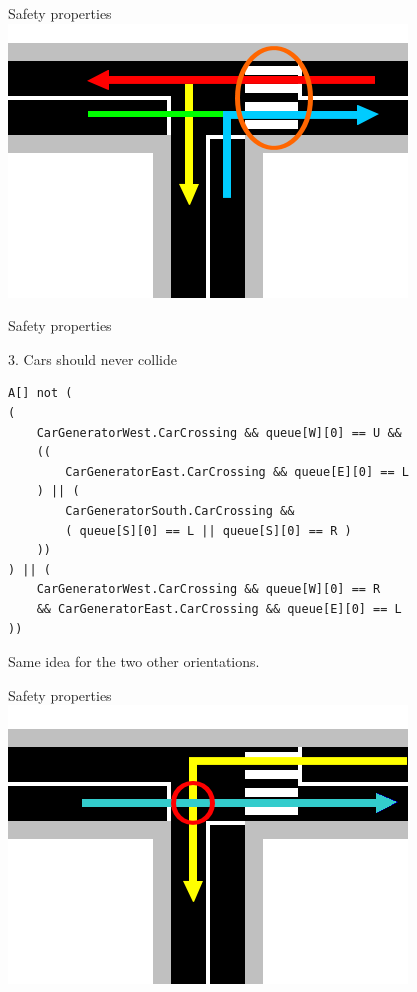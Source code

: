 \documentclass{bredelebeamer}
\begin{document}
\begin{frame}[fragile]{Safety properties}
\centering
\includegraphics[scale=0.8]{images/pietonCollision.png}

\end{frame}


\begin{frame}[fragile]{Safety properties}

\begin{block}{3. Cars should never collide}
\begin{verbatim}
A[] not (
(
    CarGeneratorWest.CarCrossing && queue[W][0] == U && 
    ((
        CarGeneratorEast.CarCrossing && queue[E][0] == L
    ) || (
        CarGeneratorSouth.CarCrossing && 
        ( queue[S][0] == L || queue[S][0] == R )
    ))
) || (
    CarGeneratorWest.CarCrossing && queue[W][0] == R 
    && CarGeneratorEast.CarCrossing && queue[E][0] == L
))
\end{verbatim}

Same idea for the two other orientations.
\end{block}

\end{frame}
\begin{frame}[fragile]{Safety properties}
\centering
\includegraphics[scale=0.8]{images/exempleCollision.png}

\end{frame}
\end{document}
